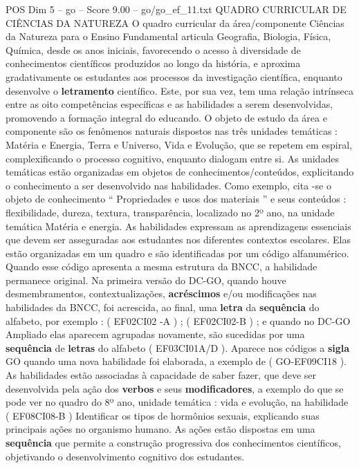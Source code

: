 \begin{textsample}{POS Dim 5 – go – Score 9.00 – go/go\_ef\_11.txt}  \label{ex:f5_pos_005}
QUADRO CURRICULAR DE CIÊNCIAS DA NATUREZA O quadro curricular da área/componente Ciências da Natureza para o Ensino Fundamental articula Geografia, Biologia, Física, Química, desde os anos iniciais, favorecendo o acesso à diversidade de conhecimentos científicos produzidos ao longo da história, e aproxima gradativamente os estudantes aos processos da investigação científica, enquanto desenvolve o \textbf{letramento} científico.
Este, por sua vez, tem uma relação intrínseca entre as oito competências específicas e as habilidades a serem desenvolvidas, promovendo a formação integral do educando.
O objeto de estudo da área e componente são os fenômenos naturais dispostos nas três unidades temáticas : Matéria e Energia, Terra e Universo, Vida e Evolução, que se repetem em espiral, complexificando o processo cognitivo, enquanto dialogam entre si.
As unidades temáticas estão organizadas em objetos de conhecimentos/conteúdos, explicitando o conhecimento a ser desenvolvido nas habilidades.
Como exemplo, cita -se o objeto de conhecimento “ Propriedades e usos dos materiais ” e seus conteúdos : flexibilidade, dureza, textura, transparência, localizado no 2º ano, na unidade temática Matéria e energia.
As habilidades expressam as aprendizagens essenciais que devem ser asseguradas aos estudantes nos diferentes contextos escolares.
Elas estão organizadas em um quadro e são identificadas por um código alfanumérico.
Quando esse código apresenta a mesma estrutura da BNCC, a habilidade permanece original.
Na primeira versão do DC-GO, quando houve desmembramentos, contextualizações, \textbf{acréscimos} e/ou modificações nas habilidades da BNCC, foi acrescida, ao final, uma \textbf{letra} da \textbf{sequência} do alfabeto, por exemplo : ( EF02CI02 -A ) ; ( EF02CI02-B ) ; e quando no DC-GO Ampliado elas aparecem agrupadas novamente, são sucedidas por uma \textbf{sequência} de \textbf{letras} do alfabeto ( EF03CI01A/D ).
Aparece nos códigos a \textbf{sigla} GO quando uma nova habilidade foi elaborada, a exemplo de ( GO-EF09CI18 ).
As habilidades estão associadas à capacidade de saber fazer, que deve ser desenvolvida pela ação dos \textbf{verbos} e seus \textbf{modificadores}, a exemplo do que se pode ver no quadro do 8º ano, unidade temática : vida e evolução, na habilidade ( EF08CI08-B ) Identificar os tipos de hormônios sexuais, explicando suas principais ações no organismo humano.
As ações estão dispostas em uma \textbf{sequência} que permite a construção progressiva dos conhecimentos científicos, objetivando o desenvolvimento cognitivo dos estudantes.

\end{textsample}
